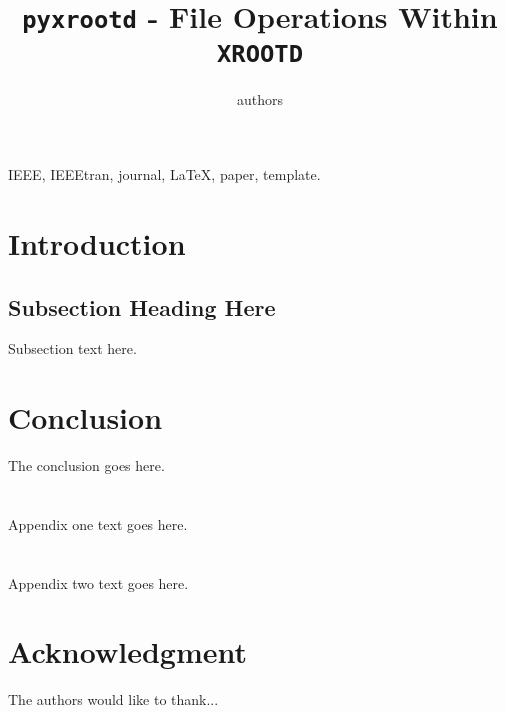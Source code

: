 \documentclass[journal]{IEEEtran}
\begin{document}
\title{\texttt{pyxrootd} - File Operations Within \texttt{XROOTD}}
\author{authors}

\maketitle

\begin{abstract}
\lipsum[1]
\end{abstract}

\begin{IEEEkeywords}
IEEE, IEEEtran, journal, \LaTeX, paper, template.
\end{IEEEkeywords}

\IEEEpeerreviewmaketitle

\section{Introduction}
\lipsum[1]

\subsection{Subsection Heading Here}
Subsection text here.
\lipsum[1-2]

\section{Conclusion}
The conclusion goes here.

\appendices
\section{}
Appendix one text goes here.

\section{}
Appendix two text goes here.


\section*{Acknowledgment}
The authors would like to thank...

\ifCLASSOPTIONcaptionsoff
  \newpage
\fi

\end{document}
